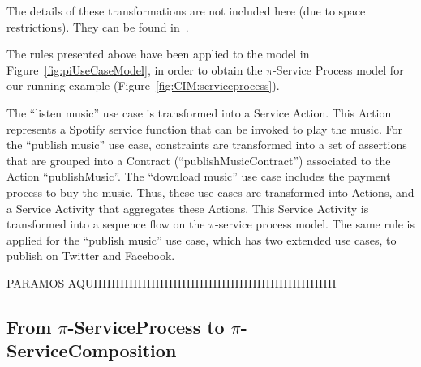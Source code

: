 The details of these transformations are not included here (due to space restrictions).
They can be found in~\cite{SouzaNeto:2012}.

\begin{example}\label{ex:toPublicMusicT1}
The rules presented above have been applied to the model in Figure~\ref{fig:piUseCaseModel}, in order to obtain the $\pi$-Service Process model for our running example (Figure~\ref{fig:CIM:serviceprocess}).

The ``listen music'' use case is transformed into a Service Action. 
This Action  represents a Spotify service function that can be invoked to play the music. 
For the ``publish music'' use case,  constraints are transformed into a set of assertions that are grouped into a Contract ({\sf ``publishMusicContract''}) associated to the Action {\sf ``publishMusic''}. 
The ``download music'' use case  includes the payment process to buy the music. 
Thus, these use cases  are transformed into {\sf Actions}, and a {\sf Service Activity} that aggregates these {\sf Actions}.   
This \textsf{Service Activity} is transformed into a sequence flow on the $\pi$-service process model.
The same rule is applied for the ``publish music'' use case, which has two extended use cases, to publish on Twitter and Facebook.
 \end{example}



PARAMOS AQUIIIIIIIIIIIIIIIIIIIIIIIIIIIIIIIIIIIIIIIIIIIIIIIIIIIIIII

\subsection{From $\pi$-ServiceProcess to $\pi$-ServiceComposition}

